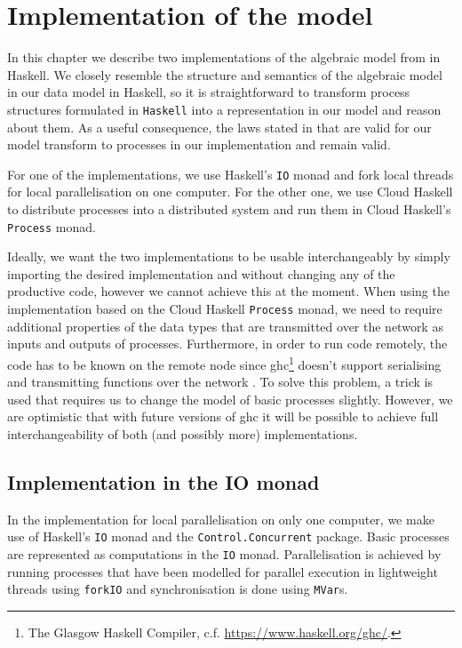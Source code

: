 \chapter{Implementation of the model}
In this chapter we describe two implementations of the algebraic model from  in \textsf{Haskell}. We closely resemble the structure and semantics of the algebraic model in our data model in \textsf{Haskell}, so it is straightforward to transform process structures formulated in \texttt{Haskell} into a representation in our model and reason about them. As a useful consequence, the laws stated in  that are valid for our model transform to processes in our implementation and remain valid.

For one of the implementations, we use \textsf{Haskell}'s \texttt{IO} monad and fork local threads for local parallelisation on one computer. For the other one, we use \textsf{Cloud Haskell} to distribute processes into a distributed system and run them in \textsf{Cloud Haskell}'s \texttt{Process} monad.

Ideally, we want the two implementations to be usable interchangeably by simply importing the desired implementation and without changing any of the productive code, however we cannot achieve this at the moment. When using the implementation based on the \textsf{Cloud Haskell} \texttt{Process} monad, we need to require additional properties of the data types that are transmitted over the network as inputs and outputs of processes. Furthermore, in order to run code remotely, the code has to be known on the remote node since \textsf{ghc}\footnote{The Glasgow Haskell Compiler, c.f. \url{https://www.haskell.org/ghc/}.} doesn't support serialising and transmitting functions over the network \cite{Epstein:2011:THC:2034675.2034690}. To solve this problem, a trick is used that requires us to change the model of basic processes slightly. However, we are optimistic that with future versions of \textsf{ghc} it will be possible to achieve full interchangeability of both (and possibly more) implementations.



\clearpage

\section{Implementation in the IO monad}
\label{chp:local}
In the implementation for local parallelisation on only one computer, we make use of \textsf{Haskell}'s \texttt{IO} monad and the \texttt{Control.Concurrent} package. Basic processes are represented as computations in the \texttt{IO} monad. Parallelisation is achieved by running processes that have been modelled for parallel execution in lightweight threads using \texttt{forkIO} and synchronisation is done using \texttt{MVar}s.

